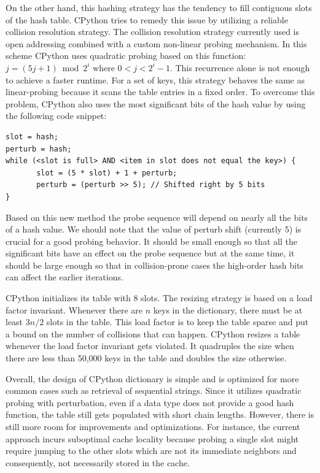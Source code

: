 \documentclass[runningheads,a4paper]{llncs}
\begin{document}
On the other hand, this hashing strategy has the tendency to fill contiguous
slots of the hash table. CPython tries to remedy this issue by utilizing a
reliable collision resolution strategy. The collision resolution strategy currently
used is open addressing combined with a custom non-linear probing mechanism. In this scheme
CPython uses quadratic probing based on this function: $j = (5j + 1) \bmod 2^i$
where $0<j<2^i-1$. This recurrence alone is not enough to achieve a faster runtime. 
For a set of keys, this strategy behaves the same as linear-probing because it scans
the table entries in a fixed order. To overcome this problem, CPython also uses the
most significant bits of the hash value by using the following code snippet:

\begin{verbatim}
slot = hash;
perturb = hash;
while (<slot is full> AND <item in slot does not equal the key>) {
       slot = (5 * slot) + 1 + perturb;
       perturb = (perturb >> 5); // Shifted right by 5 bits
}
\end{verbatim}

Based on this new method the probe sequence will depend on nearly all the bits
of a hash value. We should note that the value of  perturb shift (currently 5)
is crucial for a good probing behavior.  It should be small enough so that
all the significant bits have an effect on the probe sequence but at the same
time, it should be large enough so that in collision-prone cases the high-order hash
bits can affect the earlier iterations.

CPython initializes its table with 8 slots. The resizing strategy is based on a
load factor invariant. Whenever there are $n$ keys in the dictionary, there must
be at least $3n/2$ slots in the table. This load factor is to keep the table
sparse and put a bound on the number of collisions that can happen. CPython
resizes a table whenever the load factor invariant gets violated. It
quadruples the size when there are less than 50,000 keys in the table and
doubles the size otherwise. 

Overall, the design of CPython dictionary is simple and is optimized for more
common cases such as retrieval of sequential strings. Since it utilizes quadratic probing
with perturbation, even if a data type does not provide a good hash function,
the table still gets populated with short chain lengths. However, there is still more room for 
improvements and optimizations. For instance, the current approach incurs suboptimal cache locality because probing a single
slot might require jumping to the other slots which are not its immediate 
neighbors and consequently, not necessarily stored in the cache. 
\end{document}

